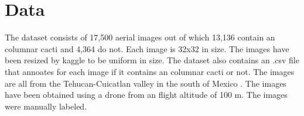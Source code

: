 
\section{Data}
The dataset\cite{KAGGLEDATA} consists of 17,500 aerial images out of which 13,136 contain an columnar cacti  and 4,364 do not.  Each image is 32x32 in size. The images have been resized by kaggle to be uniform in size. The dataset also contains an .csv file that annoates for each image if it contains an columnar cacti or not. The images are all from the Tehucan-Cuicatlan valley in the south of Mexico \cite{LOPEZJIMENEZ2019}. The images have been obtained using a drone from an flight altitude of 100 m. The images were manually labeled.
